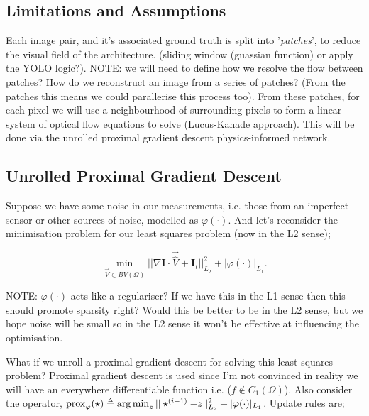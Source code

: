 \subsection*{Limitations and Assumptions}

\IEEEPARstart{}{} 


\IEEEPARstart{}{} Each image pair, and it's associated ground truth is split into '\textit{patches}', to reduce the visual field of the architecture. (sliding window (guassian function) or apply the YOLO logic?). \color{red} NOTE: we will need to define how we resolve the flow between patches? How do we reconstruct an image from a series of patches? (From the patches this means we could parallerise this process too). \color{gray} From these patches, for each pixel we will use a neighbourhood of surrounding pixels to form a linear system of optical flow equations to solve (Lucus-Kanade approach). This will be done via the unrolled proximal gradient descent physics-informed network.

\subsection*{Unrolled Proximal Gradient Descent}

Suppose we have some noise in our measurements, i.e. those from an imperfect sensor or other sources of noise, modelled as $\varphi(\cdot)$. And let's reconsider the minimisation problem for our least squares problem (now in the L2 sense);

\begin{equation*}
    \min_{\vec{V} \in BV(\Omega)} \Big|\Big| \nabla \mathbf{I} \cdot \vec{\hat{V}} + \mathbf{I}_t \Big|\Big|^{2}_{L_2} + |\varphi(\cdot)|_{L_1}.
\end{equation*}

\color{red} NOTE: $\varphi(\cdot)$ acts like a regulariser? If we have this in the L1 sense then this should promote sparsity right? Would this be better to be in the L2 sense, but we hope noise will be small so in the L2 sense it won't be effective at influencing the optimisation.\color{gray}

What if we unroll a proximal gradient descent for solving this least squares problem? Proximal gradient descent is used since I'm not convinced in reality we will have an everywhere differentiable function i.e. ($f \notin C_{1}(\Omega)$). Also consider the operator, $\operatorname*{\mathrm{prox}}_{\varphi}(\star) \triangleq \operatorname*{arg\,min}_{z} ||\star^{(i-1)} - z||^{2}_{L_2} + |\varphi(\cdot)|_{L_1}$. Update rules are;

